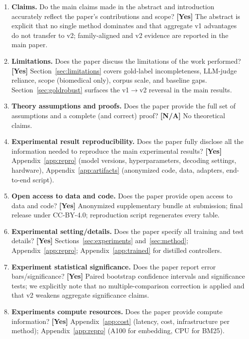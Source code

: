 \documentclass{article}
\begin{document}
\begin{enumerate}
\item \textbf{Claims.} Do the main claims made in the abstract and introduction accurately reflect the paper's contributions and scope? \textbf{[Yes]} The abstract is explicit that no single method dominates and that aggregate v1 advantages do not transfer to v2; family-aligned and v2 evidence are reported in the main paper.

\item \textbf{Limitations.} Does the paper discuss the limitations of the work performed? \textbf{[Yes]} Section~\ref{sec:limitations} covers gold-label incompleteness, LLM-judge reliance, scope (biomedical only), corpus scale, and baseline gaps. Section~\ref{sec:goldrobust} surfaces the v1$\to$v2 reversal in the main results.

\item \textbf{Theory assumptions and proofs.} Does the paper provide the full set of assumptions and a complete (and correct) proof? \textbf{[N/A]} No theoretical claims.

\item \textbf{Experimental result reproducibility.} Does the paper fully disclose all the information needed to reproduce the main experimental results? \textbf{[Yes]} Appendix~\ref{app:repro} (model versions, hyperparameters, decoding settings, hardware), Appendix~\ref{app:artifacts} (anonymized code, data, adapters, end-to-end script).

\item \textbf{Open access to data and code.} Does the paper provide open access to data and code? \textbf{[Yes]} Anonymized supplementary bundle at submission; final release under CC-BY-4.0; reproduction script regenerates every table.

\item \textbf{Experimental setting/details.} Does the paper specify all training and test details? \textbf{[Yes]} Sections~\ref{sec:experiments} and~\ref{sec:method}; Appendix~\ref{app:repro}; Appendix~\ref{app:trained} for distilled controllers.

\item \textbf{Experiment statistical significance.} Does the paper report error bars/significance? \textbf{[Yes]} Paired bootstrap confidence intervals and significance tests; we explicitly note that no multiple-comparison correction is applied and that v2 weakens aggregate significance claims.

\item \textbf{Experiments compute resources.} Does the paper provide compute information? \textbf{[Yes]} Appendix~\ref{app:cost} (latency, cost, infrastructure per method); Appendix~\ref{app:repro} (A100 for embedding, CPU for BM25).


\end{enumerate}
\end{document}
